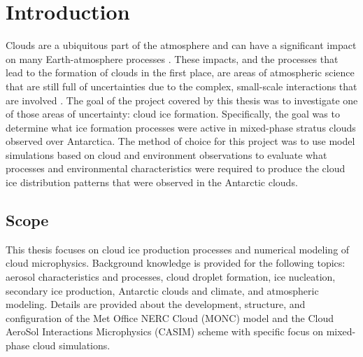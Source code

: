 \chapter{Introduction}
Clouds are a ubiquitous part of the atmosphere and can have a significant impact on many Earth-atmosphere processes \citep{rog1989,lamb2011,mur2012,tan2016,milt2018-2}. These impacts, and the processes that lead to the formation of clouds in the first place, are areas of atmospheric science that are still full of uncertainties due to the complex, small-scale interactions that are involved \citep{ipcc5,mcfa2017,milt2018-2}. The goal of the project covered by this thesis was to investigate one of those areas of uncertainty: cloud ice formation. Specifically, the goal was to determine what ice formation processes were active in mixed-phase stratus clouds observed over Antarctica. The method of choice for this project was to use model simulations based on cloud and environment observations to evaluate what processes and environmental characteristics were required to produce the cloud ice distribution patterns that were observed in the Antarctic clouds.

\section{Scope}
This thesis focuses on cloud ice production processes and numerical modeling of cloud microphysics. Background knowledge is provided for the following topics: aerosol characteristics and processes, cloud droplet formation, ice nucleation, secondary ice production, Antarctic clouds and climate, and atmospheric modeling. Details are provided about the development, structure, and configuration of the Met Office NERC Cloud (MONC) model and the Cloud AeroSol Interactions Microphysics (CASIM) scheme with specific focus on mixed-phase cloud simulations.

